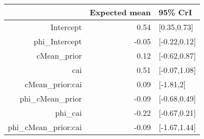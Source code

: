 \begin{tabular}{rrl}
  \hline
 & Expected mean & 95\% CrI \\ 
  \hline
Intercept & 0.54 & [0.35,0.73] \\ 
  phi\_Intercept & -0.05 & [-0.22,0.12] \\ 
  cMean\_prior & 0.12 & [-0.62,0.87] \\ 
  cai & 0.51 & [-0.07,1.08] \\ 
  cMean\_prior:cai & 0.09 & [-1.81,2] \\ 
  phi\_cMean\_prior & -0.09 & [-0.68,0.49] \\ 
  phi\_cai & -0.22 & [-0.67,0.21] \\ 
  phi\_cMean\_prior:cai & -0.09 & [-1.67,1.44] \\ 
   \hline
\end{tabular}

